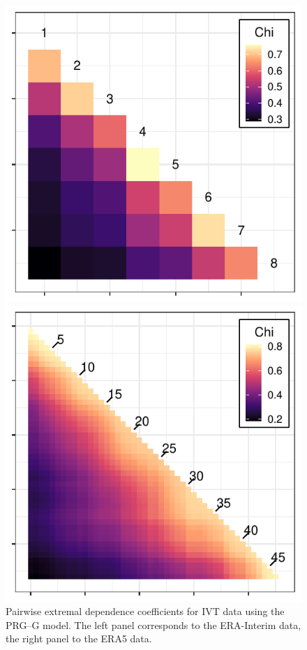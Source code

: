 \begin{figure}[ht]
    \centering
    \caption{Pairwise extremal dependence coefficients for IVT data using the PRG--G model.  
    The left panel corresponds to the ERA-Interim data, the right panel to the ERA5 data.\label{fig:chi_ij}}
    \begin{minipage}{.49\textwidth}
      \centering
      \includegraphics[width=0.99\linewidth]{./images/chi_ij_8}
    \end{minipage}
    \begin{minipage}{.49\textwidth}
      \centering
      \includegraphics[width=0.99\linewidth]{./images/chi_ij_46}
    \end{minipage}
\end{figure}

